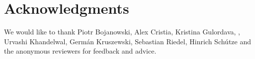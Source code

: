 










\section*{Acknowledgments}

We would like to thank Piotr Bojanowski, Alex Cristia, Kristina
Gulordava, , Urvashi Khandelwal, Germ\'{a}n Kruszewski, Sebastian
Riedel, Hinrich Sch\'{u}tze and the anonymous reviewers for feedback
and advice.








 \appendix

